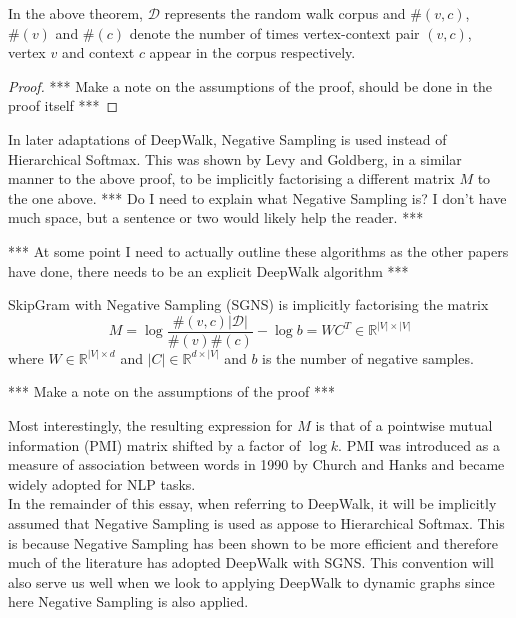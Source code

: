 \documentclass[a4paper]{article}
\begin{document}
In the above theorem, $\mathcal{D}$ represents the random walk corpus and
$\#(v,c)$, $\#(v)$ and $\#(c)$ denote the number of times vertex-context pair
$(v,c)$, vertex $v$ and context $c$ appear in the corpus respectively.

\begin{proof}

  *** Make a note on the assumptions of the proof, should be done in the proof
  itself ***

\end{proof}


In later adaptations of DeepWalk, Negative Sampling is used instead of
Hierarchical Softmax. This was shown by Levy and
Goldberg\cite{levy&goldberg}, in a similar manner to the above proof, to be
implicitly factorising a different matrix $M$ to the one above.
*** Do I need to explain what Negative Sampling is? I don't have much space, but
a sentence or two would likely help the reader. ***

*** At some point I need to actually outline these algorithms as the other
papers have done, there needs to be an explicit DeepWalk algorithm ***

\begin{theorem}
  SkipGram with Negative Sampling (SGNS) is implicitly factorising the matrix
  \[M = \log{\frac{\#(v,c)|\mathcal{D}|}{\#(v)\#(c)}} - \log{b} = WC^T\in \mathbb{R}^{|V|
      \times |V|}\]
  where $W \in \mathbb{R}^{|V| \times d}$ and $|C| \in \mathbb{R}^{d \times |V|}$
  and $b$ is the number of negative samples.
\end{theorem}

*** Make a note on the assumptions of the proof ***

Most interestingly, the resulting expression for $M$ is that of a pointwise
mutual information (PMI) matrix shifted by a factor of $\log k$. PMI was
introduced as a measure of association between words in 1990 by Church and Hanks
\cite{church1990} and became widely adopted for NLP tasks.\\

In the remainder of this essay, when referring to DeepWalk, it will be
implicitly assumed that Negative Sampling is used as appose to Hierarchical
Softmax. This is  because Negative Sampling has been shown to be more efficient
and therefore much of the literature has adopted DeepWalk with SGNS. This convention will also
serve us well when we look to applying DeepWalk to dynamic graphs since here
Negative Sampling is also applied.
\end{document}
